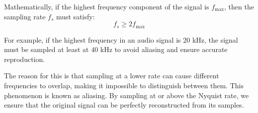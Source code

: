 Mathematically, if the highest frequency component of the signal is \( f_{\text{max}} \), then the sampling rate \( f_s \) must satisfy:
\[
f_s \geq 2f_{\text{max}}
\]

For example, if the highest frequency in an audio signal is 20 kHz, the signal must be sampled at least at 40 kHz to avoid aliasing and ensure accurate reproduction.

The reason for this is that sampling at a lower rate can cause different frequencies to overlap, making it impossible to distinguish between them. This phenomenon is known as aliasing. By sampling at or above the Nyquist rate, we ensure that the original signal can be perfectly reconstructed from its samples.


